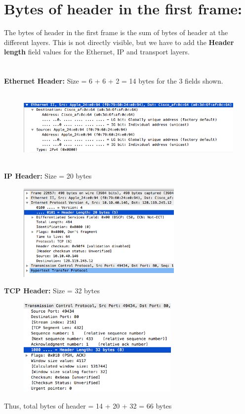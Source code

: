 \documentclass[]{report}
\begin{document}
\section{Bytes of header in the first frame:}
The bytes of header in the first frame is the sum of bytes of header at the different layers. This is not directly visible, but we have to add the \textbf{Header length} field values for the Ethernet, IP and transport layers. \\ \\ \\
\textbf{Ethernet Header:} Size = 6 + 6 + 2 = 14 bytes for the 3 fields shown.
\begin{figure}[H]
	\vspace{0pt}
	\includegraphics[height = 105pt, keepaspectratio]{Snapshots/q12_ethernet.png}
\end{figure}
\textbf{IP Header:} Size = 20 bytes 
\begin{figure}[H]
	\vspace{0pt}
	\includegraphics[height = 135pt, keepaspectratio]{Snapshots/q12_ip.png}
\end{figure}
\textbf{TCP Header:} Size = 32 bytes
\begin{figure}[H]
	\vspace{0pt}
	\includegraphics[height = 135pt, keepaspectratio]{Snapshots/q12_tcp.png}
\end{figure}
Thus, total bytes of header = 14 + 20 + 32 = 66 bytes
\end{document}
